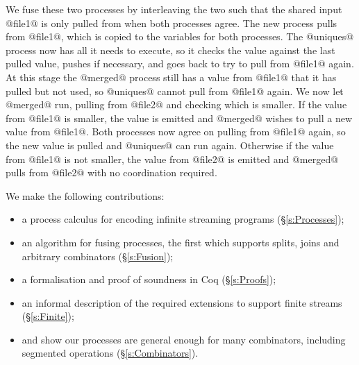 We fuse these two processes by interleaving the two such that the shared input @file1@ is only pulled from when both processes agree.
The new process pulls from @file1@, which is copied to the variables for both processes.
The @uniques@ process now has all it needs to execute, so it checks the value against the last pulled value, pushes if necessary, and goes back to try to pull from @file1@ again.
At this stage the @merged@ process still has a value from @file1@ that it has pulled but not used, so @uniques@ cannot pull from @file1@ again.
We now let @merged@ run, pulling from @file2@ and checking which is smaller.
If the value from @file1@ is smaller, the value is emitted and @merged@ wishes to pull a new value from @file1@.
Both processes now agree on pulling from @file1@ again, so the new value is pulled and @uniques@ can run again.
Otherwise if the value from @file1@ is not smaller, the value from @file2@ is emitted and @merged@ pulls from @file2@ with no coordination required.


We make the following contributions:
\begin{itemize}
\item a process calculus for encoding infinite streaming programs (\S\ref{s:Processes});
\item an algorithm for fusing processes, the first which supports splits, joins and arbitrary combinators (\S\ref{s:Fusion});
\item a formalisation and proof of soundness in Coq (\S\ref{s:Proofs});
\item an informal description of the required extensions to support finite streams (\S\ref{s:Finite});
\item and show our processes are general enough for many combinators, including segmented operations (\S\ref{s:Combinators}).
\end{itemize}


